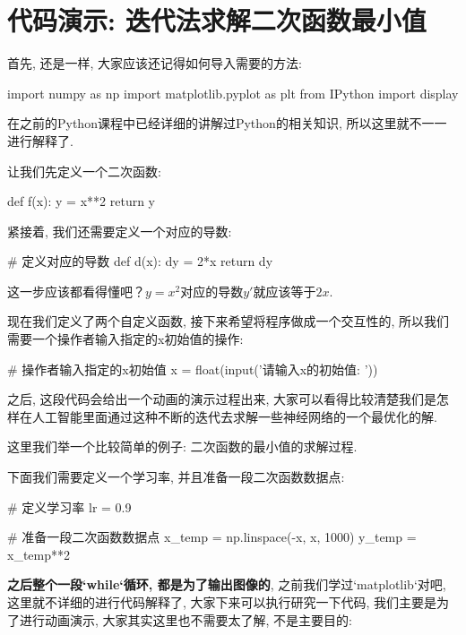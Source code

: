 \section{代码演示: 迭代法求解二次函数最小值}

首先, 还是一样, 大家应该还记得如何导入需要的方法: 

\begin{python}
import numpy as np
import matplotlib.pyplot as plt
from IPython import display
\end{python}

在之前的Python课程中已经详细的讲解过Python的相关知识, 所以这里就不一一进行解释了. 

让我们先定义一个二次函数: 

\begin{python}
def f(x):
    y = x**2
    return y
\end{python}

紧接着, 我们还需要定义一个对应的导数: 

\begin{python}
# 定义对应的导数
def d(x):
    dy = 2*x
    return dy
\end{python}

这一步应该都看得懂吧？$y=x^2$对应的导数$y'$就应该等于$2x$. 

现在我们定义了两个自定义函数, 接下来希望将程序做成一个交互性的, 所以我们需要一个操作者输入指定的x初始值的操作: 

\begin{python}
# 操作者输入指定的x初始值
x = float(input('请输入x的初始值: '))
\end{python}

之后, 这段代码会给出一个动画的演示过程出来, 大家可以看得比较清楚我们是怎样在人工智能里面通过这种不断的迭代去求解一些神经网络的一个最优化的解. 

这里我们举一个比较简单的例子: 二次函数的最小值的求解过程. 

下面我们需要定义一个学习率, 并且准备一段二次函数数据点: 

\begin{python}
# 定义学习率
lr = 0.9

# 准备一段二次函数数据点
x_temp = np.linspace(-x, x, 1000)
y_temp = x_temp**2
\end{python}

\textbf{之后整个一段`while`循环, 都是为了输出图像的}, 之前我们学过`matplotlib`对吧, 这里就不详细的进行代码解释了, 大家下来可以执行研究一下代码, 我们主要是为了进行动画演示, 大家其实这里也不需要太了解, 不是主要目的: 

